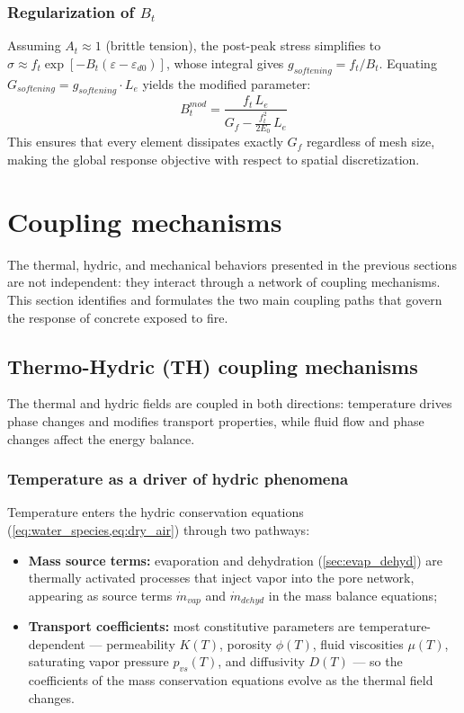 \subsubsection{Regularization of $B_t$}

Assuming $A_t \approx 1$ (brittle tension), the post-peak stress simplifies to $\sigma \approx f_t\exp[-B_t(\varepsilon - \varepsilon_{d0})]$, whose integral gives $g_{softening} = f_t/B_t$. Equating $G_{softening} = g_{softening}\cdot L_e$ yields the modified parameter:
\begin{equation}
    B_t^{mod} = \frac{f_t\,L_e}{G_f 
    - \frac{f_t^2}{2E_0}\,L_e}
\end{equation}
This ensures that every element dissipates exactly $G_f$ regardless of mesh size, making the global response objective with respect to spatial discretization.

\section{Coupling mechanisms} \label{sec:coupling}

The thermal, hydric, and mechanical behaviors presented in the previous sections are not independent: they interact through a network of coupling mechanisms. This section identifies and formulates the two main coupling paths that govern the response of concrete exposed to fire.

\subsection{Thermo-Hydric (TH) coupling mechanisms} \label{sec:TH_coupling}

The thermal and hydric fields are coupled in both directions: temperature drives phase changes and modifies transport properties, while fluid flow and phase changes affect the energy balance.

\subsubsection{Temperature as a driver of hydric phenomena}

Temperature enters the hydric conservation equations (\cref{eq:water_species,eq:dry_air}) through two pathways:

\begin{itemize}
    \item \textbf{Mass source terms:} evaporation and dehydration (\cref{sec:evap_dehyd}) are thermally activated processes that inject vapor into the pore network, appearing as source terms $\dot{m}_{vap}$ and $\dot{m}_{dehyd}$ in the mass balance equations;
    
    \item \textbf{Transport coefficients:} most constitutive parameters are temperature-dependent --- permeability $K(T)$, porosity $\phi(T)$, fluid viscosities $\mu(T)$, saturating vapor pressure $p_{vs}(T)$, and diffusivity $D(T)$ --- so the coefficients of the mass conservation equations evolve as the thermal field changes.
\end{itemize}

